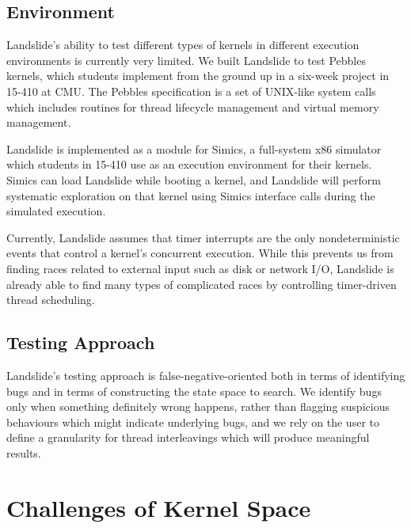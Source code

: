 \documentclass{llncs}
\begin{document}
\subsection{Environment}
\label{sec:environment}

Landslide's ability to test different types of kernels in different execution environments is currently very limited.
We built Landslide to test Pebbles kernels, which students implement from the ground up in a six-week project in 15-410 at CMU. The Pebbles specification is a set of UNIX-like system calls which includes routines for thread lifecycle management and virtual memory management.

Landslide is implemented as a module for Simics, a full-system x86 simulator which students in 15-410 use as an execution environment for their kernels. Simics can load Landslide while booting a kernel, and Landslide will perform systematic exploration on that kernel using Simics interface calls during the simulated execution.

Currently, Landslide assumes that timer interrupts are the only nondeterministic events that control a kernel's concurrent execution. While this prevents us from finding races related to external input such as disk or network I/O, Landslide is already able to find many types of complicated races by controlling timer-driven thread scheduling.

\subsection{Testing Approach}
\label{sec:approach}

Landslide's testing approach is false-negative-oriented both in terms of identifying bugs and in terms of constructing the state space to search. 
We identify bugs only when something definitely wrong happens, rather than flagging suspicious behaviours which might indicate underlying bugs, and we rely on the user to define a granularity for thread interleavings which will produce meaningful results.

\section{Challenges of Kernel Space}
\end{document}
